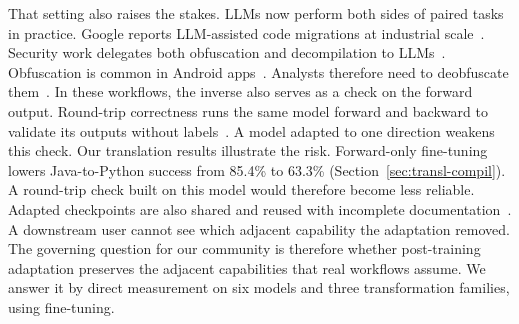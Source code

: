 
That setting also raises the stakes.
LLMs now perform both sides of paired tasks in practice.
Google reports LLM-assisted code migrations at industrial scale~\cite{nikolov2025google}.
Security work delegates both obfuscation and decompilation to LLMs~\cite{mohseni2024obfuscate, tan2024llm4decompile}.
Obfuscation is common in Android apps~\cite{wermke2018obfuscation, dong2018android}.
Analysts therefore need to deobfuscate them~\cite{bichsel2016deguard}.
In these workflows, the inverse also serves as a check on the forward output.
Round-trip correctness runs the same model forward and backward to validate its outputs without labels~\cite{allamanis2024roundtrip}.
A model adapted to one direction weakens this check.
Our translation results illustrate the risk.
Forward-only fine-tuning lowers Java-to-Python success from 85.4\% to 63.3\% (Section~\ref{sec:transl-compil}).
A round-trip check built on this model would therefore become less reliable.
Adapted checkpoints are also shared and reused with incomplete documentation~\cite{jiang2023reuse}.
A downstream user cannot see which adjacent capability the adaptation removed.
The governing question for our community is therefore whether post-training adaptation preserves the adjacent capabilities that real workflows assume.
We answer it by direct measurement on six models and three transformation families, using fine-tuning.


